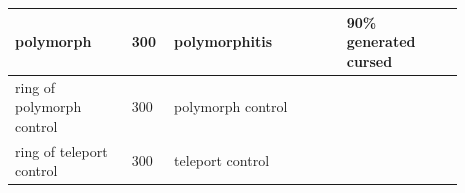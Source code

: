\begin{longtable}{|>{\RaggedRight}p{0.23487\linewidth}|>{\RaggedRight}p{0.07372\linewidth}|>{\RaggedRight}p{0.34225\linewidth}|>{\RaggedRight}p{0.23487\linewidth}|}
polymorph\footnotemark[97]&\hspace*{0pt}\ignorespaces{}\hspace*{0pt}300&\hspace*{0pt}\ignorespaces{}\hspace*{0pt}polymorphitis\footnotemark[98]&\hspace*{0pt}\ignorespaces{}\hspace*{0pt}90\% generated cursed\\ \hline \hspace*{0pt}\ignorespaces{}\hspace*{0pt}ring of polymorph control\footnotemark[99]&\hspace*{0pt}\ignorespaces{}\hspace*{0pt}300&\hspace*{0pt}\ignorespaces{}\hspace*{0pt}polymorph control\footnotemark[100]&\hspace*{0pt}\ignorespaces{}\hspace*{0pt}\\ \hline \hspace*{0pt}\ignorespaces{}\hspace*{0pt}ring of teleport control\footnotemark[101]&\hspace*{0pt}\ignorespaces{}\hspace*{0pt}300&\hspace*{0pt}\ignorespaces{}\hspace*{0pt}teleport control\footnotemark[102]&\hspace*{0pt}\ignorespaces{}\hspace*{0pt}\\ \hline 
\end{longtable}

